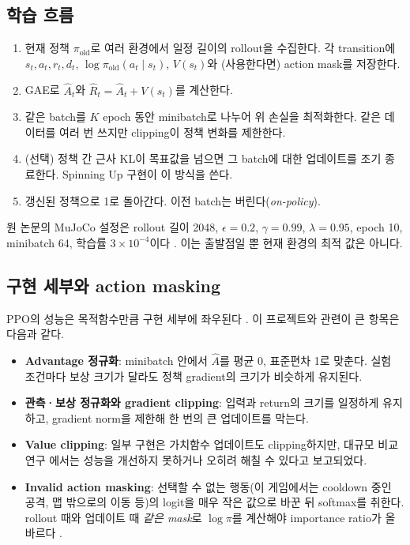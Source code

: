 \documentclass[11pt,a4paper]{article}
\begin{document}
\subsection{학습 흐름}
\begin{enumerate}
 \item 현재 정책 \(\pi_{\mathrm{old}}\)로 여러 환경에서 일정 길이의 rollout을 수집한다. 각 transition에 \(s_t,a_t,r_t,d_t\), \(\log\pi_{\mathrm{old}}(a_t\mid s_t)\), \(V(s_t)\)와 (사용한다면) action mask를 저장한다.
 \item GAE로 \(\widehat A_t\)와 \(\widehat R_t=\widehat A_t+V(s_t)\)를 계산한다.
 \item 같은 batch를 \(K\) epoch 동안 minibatch로 나누어 위 손실을 최적화한다. 같은 데이터를 여러 번 쓰지만 clipping이 정책 변화를 제한한다.
 \item (선택) 정책 간 근사 KL이 목표값을 넘으면 그 batch에 대한 업데이트를 조기 종료한다. Spinning Up 구현이 이 방식을 쓴다.
 \item 갱신된 정책으로 1로 돌아간다. 이전 batch는 버린다(\emph{on-policy}).
\end{enumerate}
원 논문의 MuJoCo 설정은 rollout 길이 2048, \(\epsilon=0.2\), \(\gamma=0.99\), \(\lambda=0.95\), epoch 10, minibatch 64, 학습률 \(3\times10^{-4}\)이다 \cite{ppo}. 이는 출발점일 뿐 현재 환경의 최적 값은 아니다.

\subsection{구현 세부와 action masking}
PPO의 성능은 목적함수만큼 구현 세부에 좌우된다 \cite{ppo-details,whatmatters}. 이 프로젝트와 관련이 큰 항목은 다음과 같다.
\begin{itemize}
 \item \textbf{Advantage 정규화}: minibatch 안에서 \(\widehat A\)를 평균 0, 표준편차 1로 맞춘다. 실험 조건마다 보상 크기가 달라도 정책 gradient의 크기가 비슷하게 유지된다.
 \item \textbf{관측·보상 정규화와 gradient clipping}: 입력과 return의 크기를 일정하게 유지하고, gradient norm을 제한해 한 번의 큰 업데이트를 막는다.
 \item \textbf{Value clipping}: 일부 구현은 가치함수 업데이트도 clipping하지만, 대규모 비교 연구 \cite{whatmatters}에서는 성능을 개선하지 못하거나 오히려 해칠 수 있다고 보고되었다.
 \item \textbf{Invalid action masking}: 선택할 수 없는 행동(이 게임에서는 cooldown 중인 공격, 맵 밖으로의 이동 등)의 logit을 매우 작은 값으로 바꾼 뒤 softmax를 취한다. rollout 때와 업데이트 때 \emph{같은 mask}로 \(\log\pi\)를 계산해야 importance ratio가 올바르다 \cite{masking}.
\end{itemize}
\end{document}
